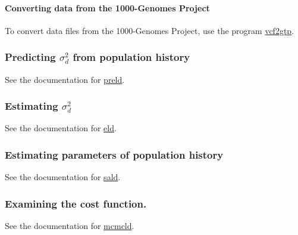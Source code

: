 \paragraph*{Converting data from the 1000-\/\+Genomes Project}

To convert data files from the 1000-\/\+Genomes Project, use the program \hyperlink{vcf2gtp_8py}{vcf2gtp}.

\subsubsection*{Predicting $\sigma_d^2$ from population history}

See the documentation for \hyperlink{preld_8c}{preld}.

\subsubsection*{Estimating $\sigma_d^2$}

See the documentation for \hyperlink{eld_8c}{eld}.

\subsubsection*{Estimating parameters of population history}

See the documentation for \hyperlink{sald_8c}{sald}.

\subsubsection*{Examining the cost function.}

See the documentation for \hyperlink{mcmcld_8c}{mcmcld}. 